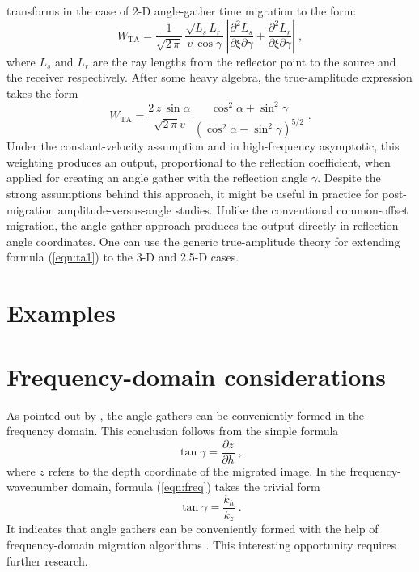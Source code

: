 \cite[]{Fomel.sep.92.267} transforms in the case of 2-D angle-gather
time migration to the form:
\begin{equation}
  \label{eqn:ta}
  W_{\mbox{TA}} = \frac{1}{\sqrt{2\,\pi}}\,
  \frac{\sqrt{L_s\,L_r}}{v\,\cos{\gamma}}\,
  \left|\frac{\partial^2 L_s}{\partial \xi \partial \gamma} +
    \frac{\partial^2 L_r}{\partial \xi \partial \gamma} 
  \right|\;,  
\end{equation}
where $L_s$ and $L_r$ are the ray lengths from the reflector point to
the source and the receiver respectively. After some heavy algebra,
the true-amplitude expression takes the form
\begin{equation}
  \label{eqn:ta1}
  W_{\mbox{TA}} = \frac{2\,z\,\sin{\alpha}}{\sqrt{2\,\pi} v}\,
  \frac{\cos^2{\alpha} + \sin^2{\gamma}}
  {\left(\cos^2{\alpha} - \sin^2{\gamma}\right)^{5/2}}\;.
\end{equation}
Under the constant-velocity assumption and in high-frequency
asymptotic, this weighting produces an output, proportional to the
reflection coefficient, when applied for creating an angle gather with
the reflection angle $\gamma$. Despite the strong assumptions behind
this approach, it might be useful in practice for post-migration
amplitude-versus-angle studies. Unlike the conventional common-offset
migration, the angle-gather approach produces the output directly in
reflection angle coordinates. One can use the generic true-amplitude
theory \cite[]{Fomel.sep.92.267} for extending formula (\ref{eqn:ta1})
to the 3-D and 2.5-D cases.

\section{Examples}



\section{Frequency-domain considerations}

As pointed out by \cite{Prucha.sep.100.marie1}, the angle gathers
can be conveniently formed in the frequency domain. This conclusion
follows from the simple formula \cite[]{Fomel.sep.92.159}
\begin{equation}
  \label{eqn:freq}
  \tan{\gamma} = \frac{\partial z}{\partial h}\;,
\end{equation}
where $z$ refers to the depth coordinate of the migrated image. In the
frequency-wavenumber domain, formula (\ref{eqn:freq}) takes the
trivial form
\begin{equation}
  \label{eqn:freq1}
  \tan{\gamma} = \frac{k_h}{k_z}\;.
\end{equation}
It indicates that angle gathers can be conveniently formed with the help
of frequency-domain migration algorithms \cite[]{GEO43-01-00230048}.
This interesting opportunity requires further research.

